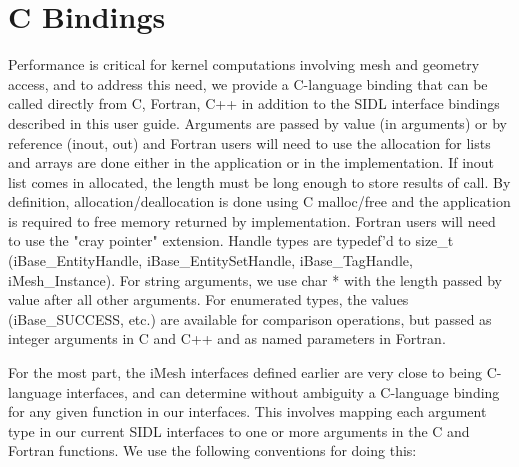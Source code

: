\documentclass{article}
\begin{document}
\section{C Bindings}

Performance is critical for kernel computations involving mesh and
geometry access, and to address this need, we provide a C-language
binding that can be called directly from C, Fortran, C++ in addition
to the SIDL interface bindings described in this user guide.
Arguments are passed by value (in arguments) or by reference (inout,
out) and Fortran users will need to use the %
allocation for lists and arrays are done either in the application or
in the implementation.  If inout list comes in allocated, the length
must be long enough to store results of call.  By definition,
allocation/deallocation is done using C malloc/free and the
application is required to free memory returned by
implementation. Fortran users will need to use the "cray pointer"
extension.  Handle types are typedef'd to size\_t (iBase\_EntityHandle,
iBase\_EntitySetHandle, iBase\_TagHandle, iMesh\_Instance). For string
arguments, we use char * with the length passed by value after all
other arguments.  For enumerated types, the values (iBase\_SUCCESS,
etc.) are available for comparison operations, but passed as integer
arguments in C and C++ and as named parameters in Fortran.

For the most part, the iMesh interfaces defined earlier are very close
to being C-language interfaces, and can determine without ambiguity a
C-language binding for any given function in our interfaces. This
involves mapping each argument type in our current SIDL interfaces to
one or more arguments in the C and Fortran functions. We use the
following conventions for doing this:
\end{document}

